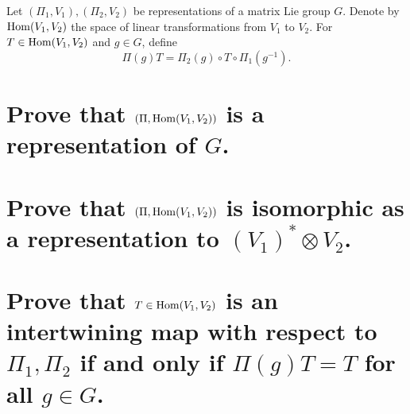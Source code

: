 \documentclass[
	pages,
	boxes,
	color=WildStrawberry
]{homework}
\begin{document}
\begin{problem}
Let $(\Pi_1, V_1), (\Pi_2, V_2)$ be representations of a matrix Lie group $G$. Denote by $\operatorname{Hom}(V_1, V_2)$ the space of linear transformations from $V_1$ to $V_2$. For $T \in \operatorname{Hom}(V_1, V_2)$ and $g \in G$, define
\[
	\Pi(g)T = \Pi_2(g) \circ T \circ \Pi_1(g^{-1}).
\]
\begin{parts}
	\part{Prove that $(\Pi, \operatorname{Hom}(V_1, V_2))$ is a representation of $G$.}\label{part:4a}
	\part{Prove that $(\Pi, \operatorname{Hom}(V_1, V_2))$ is isomorphic as a representation to $(V_1)^* \otimes V_2$.}\label{part:4b}
	\part{Prove that $T \in \operatorname{Hom}(V_1, V_2)$ is an intertwining map with respect to $\Pi_1, \Pi_2$ if and only if $\Pi(g)T = T$ for all $g \in G$.}\label{part:4c}
\end{parts}
\end{problem}
\end{document}
